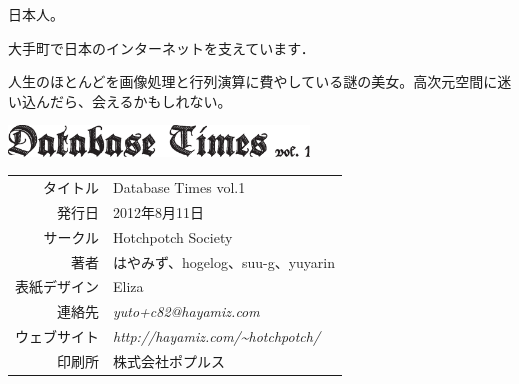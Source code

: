 \documentclass[b5paper,papersize,tombow,11pt]{jsbook}
\begin{document}
 \quad
日本人。

 \quad
大手町で日本のインターネットを支えています．

 \quad
人生のほとんどを画像処理と行列演算に費やしている謎の美女。高次元空間に迷い込んだら、会えるかもしれない。

\vspace*{70mm}

\begin{center}
 \includegraphics[width=8cm]{hayamiz/images/colophon.eps}
 \par\vspace*{1mm}
 \begin{tabular}{rl}
  \hline
  タイトル & Database Times vol.1 \\
  発行日 & 2012年8月11日 \\
  サークル & Hotchpotch Society \\
  著者 & はやみず、hogelog、suu-g、yuyarin \\
  表紙デザイン & Eliza \\
  連絡先 & {\it yuto+c82@hayamiz.com} \\
  ウェブサイト & {\it http://hayamiz.com/\~{}hotchpotch/} \\
  印刷所 & 株式会社ポプルス \\
  \hline
 \end{tabular}
\end{center}
\end{document}
